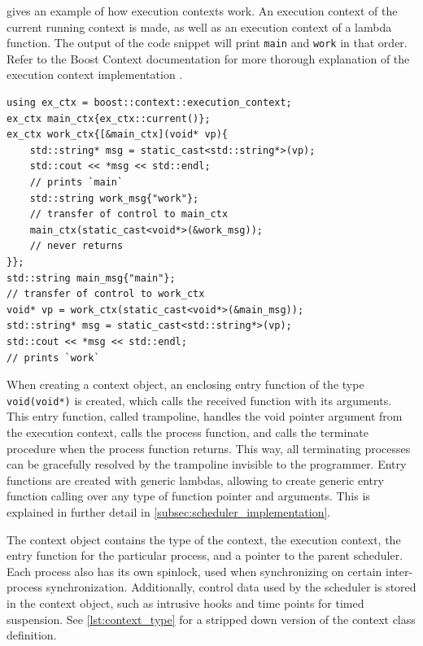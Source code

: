  gives an example of how execution contexts work. An execution context of the current running context is made, as well as an execution context of a lambda function. The output of the code snippet will print \texttt{main} and \texttt{work} in that order. Refer to the Boost Context documentation for more thorough explanation of the execution context implementation \citep{kowalke2017boost}.

\begin{lstfloat}
\begin{lstlisting}[caption={Transfer of control between execution contexts.}, label={lst:transfer_control_execution_contexts}, style={CustomC++}, xleftmargin={2em}]
using ex_ctx = boost::context::execution_context;
ex_ctx main_ctx{ex_ctx::current()};
ex_ctx work_ctx{[&main_ctx](void* vp){
    std::string* msg = static_cast<std::string*>(vp);
    std::cout << *msg << std::endl;
    // prints `main`
    std::string work_msg{"work"};
    // transfer of control to main_ctx
    main_ctx(static_cast<void*>(&work_msg));
    // never returns
}};
std::string main_msg{"main"};
// transfer of control to work_ctx
void* vp = work_ctx(static_cast<void*>(&main_msg));
std::string* msg = static_cast<std::string*>(vp);
std::cout << *msg << std::endl;
// prints `work`
\end{lstlisting}
\end{lstfloat}

When creating a context object, an enclosing entry function of the type \lstinline[style={CustomC++}]|void(void*)| is created, which calls the received function with its arguments. This entry function, called trampoline, handles the void pointer argument from the execution context, calls the process function, and calls the terminate procedure when the process function returns. This way, all terminating processes can be gracefully resolved by the trampoline invisible to the programmer. Entry functions are created with generic lambdas, allowing to create generic entry function calling over any type of function pointer and arguments. This is explained in further detail in \cref{subsec:scheduler_implementation}.

The context object contains the type of the context, the execution context, the entry function for the particular process, and a pointer to the parent scheduler. Each process also has its own spinlock, used when synchronizing on certain inter\hyp{}process synchronization. Additionally, control data used by the scheduler is stored in the context object, such as intrusive hooks and time points for timed suspension. See \cref{lst:context_type} for a stripped down version of the context class definition.

